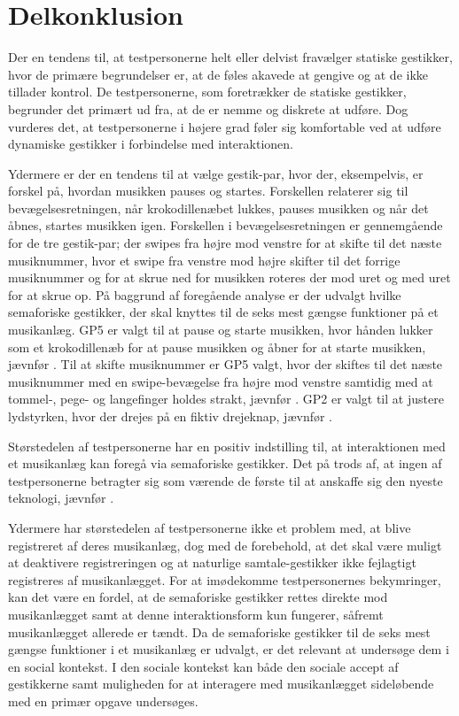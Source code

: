 \section{Delkonklusion}
\label{ValgAfGestikkerDelkonklusion}
%
Der en tendens til, at testpersonerne helt eller delvist fravælger statiske gestikker, hvor de primære begrundelser er, at de føles akavede at gengive og at de ikke tillader kontrol. De testpersonerne, som foretrækker de statiske gestikker, begrunder det primært ud fra, at de er nemme og diskrete at udføre. Dog vurderes det, at testpersonerne i højere grad føler sig komfortable ved at udføre dynamiske gestikker i forbindelse med interaktionen. 

Ydermere er der en tendens til at vælge gestik-par, hvor der, eksempelvis, er forskel på, hvordan musikken pauses og startes. Forskellen relaterer sig til bevægelsesretningen, når krokodillenæbet lukkes, pauses musikken og når det åbnes, startes musikken igen. Forskellen i bevægelsesretningen er gennemgående for de tre gestik-par; der swipes fra højre mod venstre for at skifte til det næste musiknummer, hvor et swipe fra venstre mod højre skifter til det forrige musiknummer og for at skrue ned for musikken roteres der mod uret og med uret for at skrue op.\blankline
%
På baggrund af foregående analyse er der udvalgt hvilke semaforiske gestikker, der skal knyttes til de seks mest gængse funktioner på et musikanlæg. GP5 er valgt til at pause og starte musikken, hvor hånden lukker som et krokodillenæb for at pause musikken og åbner for at starte musikken, jævnfør . Til at skifte musiknummer er GP5 valgt, hvor der skiftes til det næste musiknummer med en swipe-bevægelse fra højre mod venstre samtidig med at tommel-, pege- og langefinger holdes strakt, jævnfør . GP2 er valgt til at justere lydstyrken, hvor der drejes på en fiktiv drejeknap, jævnfør . 

Størstedelen af testpersonerne har en positiv indstilling til, at interaktionen med et musikanlæg kan foregå via semaforiske gestikker. Det på trods af, at ingen af testpersonerne betragter sig som værende de første til at anskaffe sig den nyeste teknologi, jævnfør . 

Ydermere har størstedelen af testpersonerne ikke et problem med, at blive registreret af deres musikanlæg, dog med de forebehold, at det skal være muligt at deaktivere registreringen og at naturlige samtale-gestikker ikke fejlagtigt registreres af musikanlægget. For at imødekomme testpersonernes bekymringer, kan det være en fordel, at de semaforiske gestikker rettes direkte mod musikanlægget samt at denne interaktionsform kun fungerer, såfremt musikanlægget allerede er tændt. \blankline
%
Da de semaforiske gestikker til de seks mest gængse funktioner i et musikanlæg er udvalgt, er det relevant at undersøge dem i en social kontekst. I den sociale kontekst kan både den sociale accept af gestikkerne samt muligheden for at interagere med musikanlægget sideløbende med en primær opgave undersøges. 